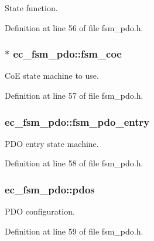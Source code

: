 State function. 



Definition at line 56 of file fsm\-\_\-pdo.\-h.

\subsubsection[{fsm\-\_\-coe}]{$\ast$ ec\-\_\-fsm\-\_\-pdo\-::fsm\-\_\-coe}\label{structec__fsm__pdo_af81a92fdb4a376a02c5f0a1cf60917b4}


Co\-E state machine to use. 



Definition at line 57 of file fsm\-\_\-pdo.\-h.

\subsubsection[{fsm\-\_\-pdo\-\_\-entry}]{ ec\-\_\-fsm\-\_\-pdo\-::fsm\-\_\-pdo\-\_\-entry}\label{structec__fsm__pdo_aee68eda7245e56950c5409bf92c36c7d}


P\-D\-O entry state machine. 



Definition at line 58 of file fsm\-\_\-pdo.\-h.

\subsubsection[{pdos}]{ ec\-\_\-fsm\-\_\-pdo\-::pdos}\label{structec__fsm__pdo_ac1519353602acca12353ea0719a6ba85}


P\-D\-O configuration. 



Definition at line 59 of file fsm\-\_\-pdo.\-h.

